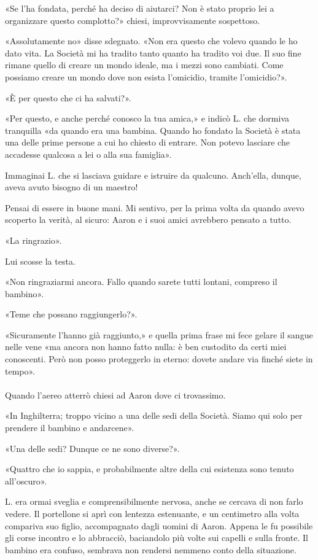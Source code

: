 \documentclass[a4paper,12pt]{book}
\begin{document}
«Se l'ha fondata, perché ha deciso di aiutarci? Non è stato proprio lei a
organizzare questo complotto?» chiesi, improvvisamente sospettoso.

«Assolutamente no» disse sdegnato. «Non era questo che volevo quando le ho dato
vita. La Società mi ha tradito tanto quanto ha tradito voi due. Il suo fine
rimane quello di creare un mondo ideale, ma i mezzi sono cambiati. Come possiamo
creare un mondo dove non esista l'omicidio, tramite l'omicidio?».

«È per questo che ci ha salvati?».

«Per questo, e anche perché conosco la tua amica,» e indicò L. che dormiva
tranquilla «da quando era una bambina. Quando ho fondato la Società è stata una
delle prime persone a cui ho chiesto di entrare. Non potevo lasciare che
accadesse qualcosa a lei o alla sua famiglia».

Immaginai L. che si lasciava guidare e istruire da qualcuno. Anch'ella, dunque,
aveva avuto bisogno di un maestro!

Pensai di essere in buone mani. Mi sentivo, per la prima volta da quando avevo
scoperto la verità, al sicuro: Aaron e i suoi amici avrebbero pensato a tutto.

«La ringrazio».

Lui scosse la testa.

«Non ringraziarmi ancora. Fallo quando sarete tutti lontani, compreso il
bambino».

«Teme che possano raggiungerlo?».

«Sicuramente l'hanno già raggiunto,» e quella prima frase mi fece gelare il
sangue nelle vene «ma ancora non hanno fatto nulla: è ben custodito da certi
miei conoscenti. Però non posso proteggerlo in eterno: dovete andare via finché
siete in tempo».

\paragraph{}
Quando l'aereo atterrò chiesi ad Aaron dove ci trovassimo.

«In Inghilterra; troppo vicino a una delle sedi della Società. Siamo qui solo
per prendere il bambino e andarcene».

«Una delle sedi? Dunque ce ne sono diverse?».

«Quattro che io sappia, e probabilmente altre della cui esistenza sono tenuto
all'oscuro».

L. era ormai sveglia e comprensibilmente nervosa, anche se cercava di non farlo
vedere. Il portellone si aprì con lentezza estenuante, e un centimetro alla
volta compariva suo figlio, accompagnato dagli uomini di Aaron. Appena le fu
possibile gli corse incontro e lo abbracciò, baciandolo più volte sui capelli e
sulla fronte. Il bambino era confuso, sembrava non rendersi nemmeno conto della
situazione.
\end{document}
